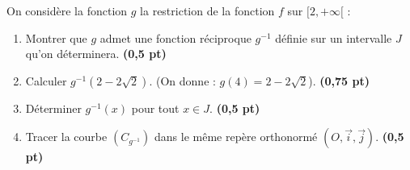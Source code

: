\documentclass[12pt,a4paper]{article}
\begin{document}
\begin{enumerate}
On considère la fonction \( g \) la restriction de la fonction \( f \) sur \( [2, +\infty[ \) :

\begin{enumerate}
    \item Montrer que \( g \) admet une fonction réciproque \( g^{-1} \) définie sur un intervalle \( J \) qu'on déterminera. \hspace{1cm} \textbf{(0,5 pt)}
    
    \item Calculer \( g^{-1}(2 - 2\sqrt{2}) \). (On donne : \( g(4) = 2 - 2\sqrt{2} \)). \hspace{1cm} \textbf{(0,75 pt)}
    
    \item Déterminer \( g^{-1}(x) \) pour tout \( x \in J \). \hspace{3cm} \textbf{(0,5 pt)}
    
    \item Tracer la courbe \( (C_{g^{-1}}) \) dans le même repère orthonormé \( (O, \vec{i}, \vec{j}) \). \hspace{2cm} \textbf{(0,5 pt)}
\end{enumerate}

\end{enumerate}
\end{document}
